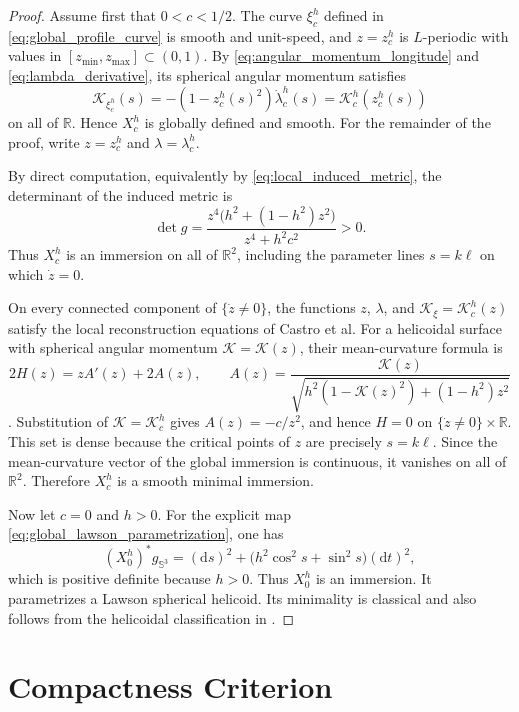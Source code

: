 \documentclass[a4paper,11pt]{amsart}
\numberwithin{equation}{section}
\theoremstyle{plain}
\newcommand{\dif}{\mathrm{d}}
\begin{document}
\begin{proof}
Assume first that $0<c<1/2$. The curve $\xi_c^h$ defined in
\eqref{eq:global_profile_curve} is smooth and unit-speed, and
$z=z_c^h$ is $L$-periodic with values in
$[z_{\min},z_{\max}]\subset(0,1)$. By
\eqref{eq:angular_momentum_longitude} and
\eqref{eq:lambda_derivative}, its spherical angular momentum satisfies
\[
\mathcal K_{\xi_c^h}(s)
=-(1-z_c^h(s)^2)\dot\lambda_c^h(s)
=\mathcal K_c^h(z_c^h(s))
\]
on all of $\mathbb R$. Hence $X_c^h$ is globally defined and smooth.
For the remainder of the proof, write $z=z_c^h$ and
$\lambda=\lambda_c^h$.

By direct computation, equivalently by
\eqref{eq:local_induced_metric}, the determinant of the induced metric is
\[
\det g
=
\frac{z^4\bigl(h^2+(1-h^2)z^2\bigr)}{z^4+h^2c^2}>0.
\]
Thus $X_c^h$ is an immersion on all of $\mathbb R^2$, including the
parameter lines $s=k\ell$ on which $\dot z=0$.

On every connected component of $\{\dot z\neq0\}$, the functions $z$,
$\lambda$, and $\mathcal K_\xi=\mathcal K_c^h(z)$ satisfy the local
reconstruction equations of Castro et al. For a helicoidal surface with
spherical angular momentum $\mathcal K=\mathcal K(z)$, their
mean-curvature formula is
\[
2H(z)=zA'(z)+2A(z),
\qquad
A(z)
=
\frac{\mathcal K(z)}
{\sqrt{h^2(1-\mathcal K(z)^2)+(1-h^2)z^2}}
\]
\cite[Eq.~(4.12)]{Castro2024}. Substitution of
$\mathcal K=\mathcal K_c^h$ gives $A(z)=-c/z^2$, and hence $H=0$ on
$\{\dot z\neq0\}\times\mathbb R$. This set is dense because the
critical points of $z$ are precisely $s=k\ell$. Since the
mean-curvature vector of the global immersion is continuous, it vanishes
on all of $\mathbb R^2$. Therefore $X_c^h$ is a smooth minimal
immersion.

Now let $c=0$ and $h>0$. For the explicit map
\eqref{eq:global_lawson_parametrization}, one has
\[
(X_0^h)^*g_{\mathbb S^3}
=
(\dif s)^2+\bigl(h^2\cos^2s+\sin^2s\bigr)(\dif t)^2,
\]
which is positive definite because $h>0$. Thus $X_0^h$ is an immersion.
It parametrizes a Lawson spherical helicoid. Its minimality is
classical \cite[Section~7]{Lawson1970} and also follows from the helicoidal
classification in \cite[Example~2.3]{Castro2024}.
\end{proof}



\section{Compactness Criterion}
\label{sec:compactness}
\end{document}
